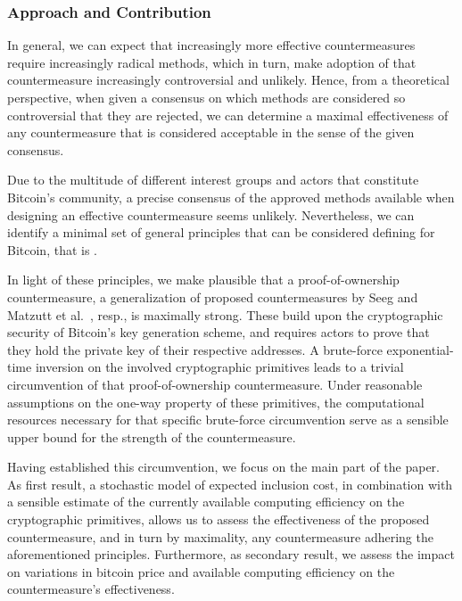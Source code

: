 \documentclass[a4paper,11pt,titlepage]{scrbook}
\begin{document}
\subsubsection*{Approach and Contribution}

In general, we can expect that increasingly more effective countermeasures require increasingly radical methods, which in turn, make adoption of that countermeasure increasingly controversial and unlikely.
Hence, from a theoretical perspective, when given a consensus on which methods are considered so controversial that they are rejected, we can determine a maximal effectiveness of any countermeasure that is considered acceptable in the sense of the given consensus.

Due to the multitude of different interest groups and actors that constitute Bitcoin's community, a precise consensus of the approved methods available when designing an effective countermeasure seems unlikely.
Nevertheless, we can identify a minimal set of general principles that can be considered defining for Bitcoin, that is .

In light of these principles, we make plausible that a proof-of-ownership countermeasure, a generalization of proposed countermeasures by Seeg \cite{seeg_hardening_2018} and Matzutt et al.~\cite{matzutt_thwarting_2018}, resp., is maximally strong.
These build upon the cryptographic security of Bitcoin's key generation scheme, and requires actors to prove that they hold the private key of their respective addresses.
A brute-force exponential-time inversion on the involved cryptographic primitives leads to a trivial circumvention of that proof-of-ownership countermeasure.
Under reasonable assumptions on the one-way property of these primitives, the computational resources necessary for that specific brute-force circumvention serve as a sensible upper bound for the strength of the countermeasure.

Having established this circumvention, we focus on the main part of the paper.
As first result, a stochastic model of expected inclusion cost, in combination with a sensible estimate of the currently available computing efficiency on the cryptographic primitives, allows us to assess the effectiveness of the proposed countermeasure, and in turn by maximality, any countermeasure adhering the aforementioned principles.
Furthermore, as secondary result, we assess the impact on variations in bitcoin price and available computing efficiency on the countermeasure's effectiveness.
\end{document}
